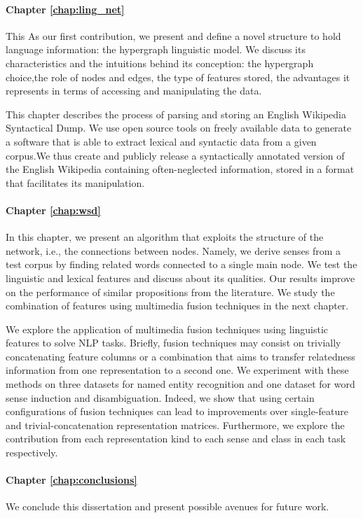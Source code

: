 \paragraph{Chapter \ref{chap:ling_net}} This As our first contribution, we present and define a novel structure to hold language information: the hypergraph linguistic model.  We discuss its characteristics and the intuitions behind its conception: the hypergraph choice,the role of nodes and edges, the type of features stored, the advantages it represents in terms of accessing and manipulating the data. 

This chapter describes the process of parsing and storing an English Wikipedia Syntactical Dump. We use open source tools on freely available data to generate a software that is able to extract lexical and syntactic data from a given corpus.We thus create and publicly release a syntactically annotated version of the English Wikipedia containing often-neglected information, stored in a format that facilitates its manipulation. 
\paragraph{Chapter \ref{chap:wsd}} In this chapter, we present an algorithm that exploits the structure of the network, i.e., the connections between nodes. Namely, we derive senses from a test corpus by finding related words connected to a single main node. We test the linguistic and lexical features and discuss about its qualities. Our results improve on the performance of similar propositions from the literature. We study the combination of features using multimedia fusion techniques in the next chapter.

We explore the application of multimedia fusion techniques using linguistic features to solve NLP tasks. Briefly, fusion techniques may consist on trivially concatenating feature columns or a combination that aims to transfer relatedness information from one representation to a second one. We experiment with these methods on three datasets for named entity recognition and one dataset for word sense induction and disambiguation. Indeed, we show that using certain configurations of fusion techniques can lead to improvements over single-feature and trivial-concatenation representation matrices. Furthermore, we explore the contribution from each representation kind to each sense and class in each task respectively.

\paragraph{Chapter \ref{chap:conclusions}} We conclude this dissertation and present possible avenues for future work.

